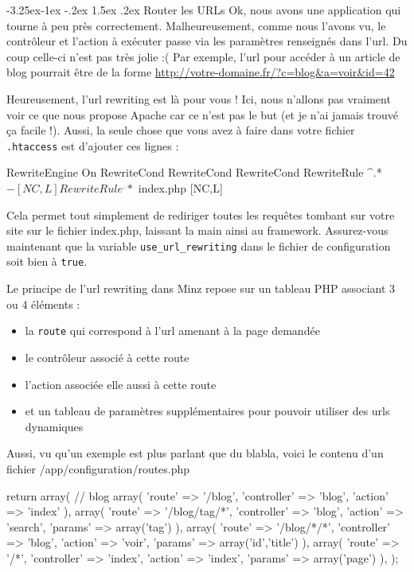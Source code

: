 \documentclass[a4paper,11pt]{article}
\makeatletter
\renewcommand{\subsection}{\@startsection{subsection}{2}{\z@}%
             {-3.25ex\@plus -1ex \@minus -.2ex}%
             {1.5ex \@plus .2ex}%
             {\color{bleuFonce}\normalfont\large\bfseries}}
\makeatother
\begin{document}
\subsection{Router les URLs}
Ok, nous avons une application qui tourne à peu près correctement. Malheureusement, comme nous l'avons vu, le contrôleur et l'action à exécuter passe via les paramètres renseignés dans l'url. Du coup celle-ci n'est pas très jolie :( Par exemple, l'url pour accéder à un article de blog pourrait être de la forme \url{http://votre-domaine.fr/?c=blog&a=voir&id=42}

Heureusement, l'url rewriting est là pour vous ! Ici, nous n'allons pas vraiment voir ce que nous propose Apache car ce n'est pas le but (et je n'ai jamais trouvé ça facile !). Aussi, la seule chose que vous avez à faire dans votre fichier \texttt{.htaccess} est d'ajouter ces lignes :
\begin{htaccess}
RewriteEngine On
RewriteCond %
RewriteCond %
RewriteCond %
RewriteRule ^.*$ - [NC,L]
RewriteRule ^.*$ index.php [NC,L]
\end{htaccess}

Cela permet tout simplement de rediriger toutes les requêtes tombant sur votre site sur le fichier index.php, laissant la main ainsi au framework. Assurez-vous maintenant que la variable \texttt{use\_url\_rewriting} dans le fichier de configuration soit bien à \texttt{true}.

Le principe de l'url rewriting dans Minz repose sur un tableau PHP associant 3 ou 4 éléments :
\begin{itemize}
  \item la \texttt{route} qui correspond à l'url amenant à la page demandée
  \item le contrôleur associé à cette route
  \item l'action associée elle aussi à cette route
  \item et un tableau de paramètres supplémentaires pour pouvoir utiliser des urls dynamiques
\end{itemize}

Aussi, vu qu'un exemple est plus parlant que du blabla, voici le contenu d'un fichier /app/configuration/routes.php
\begin{PHP}
return array(
  // blog
  array(
    'route'       => '/blog',
    'controller'  => 'blog',
    'action'      => 'index'
  ),
  array(
    'route'       => '/blog/tag/*',
    'controller'  => 'blog',
    'action'      => 'search',
    'params'      => array('tag')
  ),
  array(
    'route'       => '/blog/*/*',
    'controller'  => 'blog',
    'action'      => 'voir',
    'params'      => array('id','title')
  ),
  array(
    'route'       => '/*',
    'controller'  => 'index',
    'action'      => 'index',
    'params'      => array('page')
    ),
);
\end{PHP}
\end{document}
